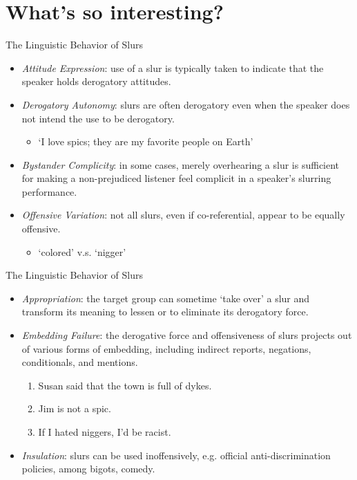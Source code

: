 \documentclass[xcolor=dvipsnames,12pt,handout]{beamer}
\begin{document}
\section{What's so interesting?}
\begin{frame}{The Linguistic Behavior of Slurs}

\begin{itemize}
\item \textit{Attitude Expression}: use of a slur is typically taken to indicate that the speaker holds derogatory attitudes.
\pause
\medskip
\item \textit{Derogatory Autonomy}: slurs are often derogatory even when the speaker does not intend the use to be derogatory.
\begin{itemize}
\item `I love spics; they are my favorite people on Earth'
\end{itemize}
\medskip
\pause
\item \textit{Bystander Complicity}: in some cases, merely overhearing a slur is sufficient for making a non-prejudiced listener feel complicit in a speaker’s slurring performance.
\medskip
\pause
\item \textit{Offensive Variation}: not all slurs, even if co-referential, appear to be equally offensive. 
\begin{itemize}
\item `colored' v.s. `nigger'
\end{itemize}


\end{itemize}
\end{frame}

\begin{frame}{The Linguistic Behavior of Slurs}
\begin{itemize}
\vspace{-.5cm}
\pause
\item \textit{Appropriation}: the target group can sometime `take over' a slur and transform its meaning to lessen or to eliminate its derogatory force.
\bigskip
\pause
\item \textit{Embedding Failure}: the derogative force and offensiveness of slurs projects out of various forms of embedding, including
indirect reports, negations, conditionals, and mentions.
\pause
\begin{enumerate}
\item Susan said that the town is full of dykes.
\item Jim is not a spic.
\item If I hated niggers, I'd be racist.
\end{enumerate}
\bigskip
\pause
\item \textit{Insulation}: slurs can be used inoffensively, e.g. official anti-discrimination policies, among bigots, comedy.

\end{itemize}
\end{frame}
\end{document}

